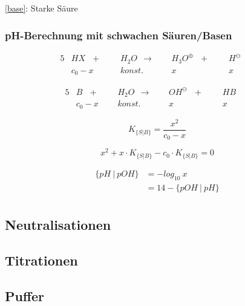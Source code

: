 \ref{base}: Starke Säure

\subsubsection{pH-Berechnung mit schwachen Säuren/Basen}


\begin{alignat*}{5}
	&HX \ \ \ +\ \ \ &&H_2O\ \ \rightarrow \ \ &&H_3O^\oplus \ \ \ +\ \ \ &&H^\ominus && \\
	&c_0 - x && konst. && x && x &&
\end{alignat*}

\begin{alignat*}{5}
	&B \ \ \ +\ \ \ &&H_2O\ \ \rightarrow \ \ &&OH^\ominus \ \ \ +\ \ \ &&HB && \\
	&c_0 - x && konst. && x && x &&
\end{alignat*}

{\large
	\begin{equation}
		K_{\{S|B\}} = \frac{x^2}{c_0-x}
	\end{equation}	
}

{\large
	\begin{equation}
	x^2 + x\cdot K_{\{S|B\}} - c_0 \cdot K_{\{S|B\}} = 0
	\end{equation}
}

{\large
	\begin{equation}
	\begin{split}
		\{pH\ |\ pOH\}&=-log_{10}\ x \\
		&=14-\{pOH\  |\  pH\} \\
	\end{split}
	\end{equation}
}

\subsection{Neutralisationen}

\subsection{Titrationen}

\subsection{Puffer}

